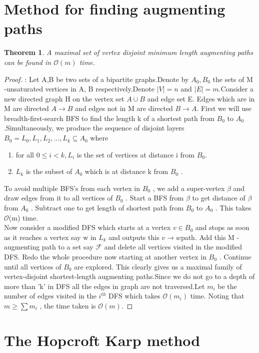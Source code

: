 \documentclass[a4paper]{report}
\newtheorem{theorem}{Theorem}[section]
\theoremstyle{definition}
\begin{document}
\section{Method for finding augmenting paths}\label{construct_graph}
\begin{theorem}A maximal set of vertex disjoint minimum length augmenting paths can be found in $\mathcal{O}(m)$ time.	
\end{theorem}
\begin{proof}:
Let A,B be two sets of a bipartite graphs.Denote by $A_0 , B_0$ the sets of M -unsaturated vertices in A, B respectively.Denote $|V|=n$ and $|E|=m$.Consider a new directed graph H on the vertex set $A \cup B$ and edge set E.
Edges which are in M are directed $A \rightarrow B$ and edges not in M are directed $B \rightarrow A$.
First we will use breadth-first-search BFS to find the length k of a shortest path from $B_0$ to $A_0$.Simultaneously, we produce the sequence of disjoint layers $B_0 = L_0 , L_1 , L_2 , ..., L_k \subseteq A_0$ where
\begin{enumerate}
\item for all $0 \leq i < k, L_i$ is the set of vertices at distance i from $B_0$.
\item $L_k$ is the subset of $A_0$ which is at distance k from $B_0$ .
\end{enumerate}
To avoid multiple BFS's from each vertex in $B_0$ , we add a super-vertex $\beta$ and draw edges
from it to all vertices of $B_0$ . Start a BFS from $\beta$ to get distance of $\beta$ from $A_0$ . Subtract one
to get length of shortest path from $B_0$ to $A_0$ . This takes $\mathcal{O}$(m) time.\\
Now consider a modified DFS which starts at a vertex $v \in B_0$ and stops as soon as it reaches a vertex say w in $L_k$ and outputs this $v \rightarrow w $path. Add this M -augmenting path to a set say $\mathcal{F}$ and delete all vertices visited in the modified DFS. Redo the whole procedure now starting at another vertex in $B_0$ . Continue until all vertices
of $B_0$ are explored. This clearly gives us a maximal family of vertex-disjoint shortest-length augmenting paths.Since we do not go to a depth of more than 'k' in DFS all the edges in graph are not traversed.Let $m_i$ be the number of edges visited in the $i^{th}$ DFS which takes $\mathcal{O}(m_i)$ time. Noting that $m \geq \sum m_i$ , the time taken is $\mathcal{O}(m)$.
\end{proof}

\section{The Hopcroft Karp method}
\end{document}
